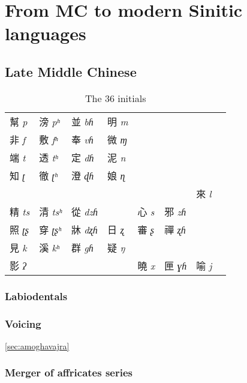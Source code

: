 \documentclass[oneside,a4paper,11pt]{article}
\newcommand{\ipa}[1]{{\phon\textit{#1}}}
\newcommand{\zh}[1]{{\cn #1}}
\newcommand{\zhc}[2]{\zh{#1} \ipa{#2}}
\begin{document}
\section{From MC to modern Sinitic languages}

\subsection{Late Middle Chinese}

\begin{table}[H]
\caption{The 36 initials} \centering
\begin{tabular}{llllllll}
\toprule
\zhc{幫}{p} & 	\zhc{滂}{pʰ} & 	\zhc{並}{bɦ} & 	\zhc{明}{m} & 	 & 	 & 	 & 	\\
\zhc{非}{f} & 	\zhc{敷}{fʰ} & 	\zhc{奉}{vɦ} & 	\zhc{微}{ɱ} & 	 & 	 & 	 & 	\\
\zhc{端}{t} & 	\zhc{透}{tʰ} & 	\zhc{定}{dɦ} & 	\zhc{泥}{n} & 	 & 	 & 	 & 	\\
\zhc{知}{ʈ} & 	\zhc{徹}{ʈʰ} & 	\zhc{澄}{ɖɦ} & 	\zhc{娘}{ɳ} & 	 & 	 & 	 & 	\\
 & 	 & 	 & 	 & 	 & 	 & 	\zhc{來}{l} & 	\\
\zhc{精}{ts} & 	\zhc{清}{tsʰ} & 	\zhc{從}{dzɦ} & 	 & 	\zhc{心}{s} & 	\zhc{邪}{zɦ} & 	 & 	\\
\zhc{照}{ʈʂ} & 	\zhc{穿}{ʈʂʰ} & 	\zhc{牀}{dʐɦ} & 	\zhc{日}{ʐ} & 	\zhc{審}{ʂ} & 	\zhc{禪}{ʐɦ} & 	 & 	\\
\zhc{見}{k} & 	\zhc{溪}{kʰ} & 	\zhc{群}{gɦ} & 	\zhc{疑}{ŋ} & 	 & 	 & 	 & 	\\
\zhc{影}{ʔ} & 	 & 	 & 	 & 	\zhc{曉}{x} & 	\zhc{匣}{ɣɦ} & 	\zhc{喻}{j} & 	\\
\bottomrule
\end{tabular}
\end{table}

\subsubsection{Labiodentals}

\subsubsection{Voicing}

\ref{sec:amoghavajra}

\subsubsection{Merger of affricates series}
\end{document}
